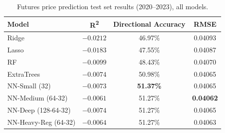 \documentclass[pdflatex,sn-mathphys-num, oneside]{sn-jnl}%
\theoremstyle{thmstyleone}%
\theoremstyle{thmstyletwo}%
\theoremstyle{thmstylethree}%
\begin{document}
\begin{table}[h]
\centering
\caption{Futures price prediction test set results (2020--2023), all models.}
\label{tab:futures_comparison}
\begin{tabular}{lccc}
\toprule
\textbf{Model} & \textbf{R\textsuperscript{2}} & \textbf{Directional Accuracy} & \textbf{RMSE} \\
\midrule
Ridge                  & $-0.0212$ & 46.97\% & 0.04093 \\
Lasso                  & $-0.0183$ & 47.55\% & 0.04087 \\
RF                     & $-0.0099$ & 48.43\% & 0.04070 \\
ExtraTrees             & $-0.0074$ & 50.98\% & 0.04065 \\
NN-Small (32)          & $-0.0073$ & \textbf{51.37\%} & 0.04065 \\
NN-Medium (64-32)      & $\mathbf{-0.0061}$ & 51.27\% & \textbf{0.04062} \\
NN-Deep (128-64-32)    & $-0.0074$ & 51.27\% & 0.04065 \\
NN-Heavy-Reg (64-32)   & $-0.0064$ & 51.27\% & 0.04063 \\
\bottomrule
\end{tabular}
\end{table}
\end{document}
